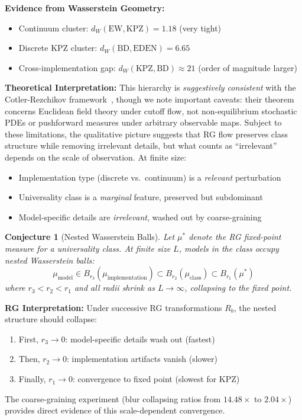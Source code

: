 \documentclass[aps,pre,reprint,amsmath,amssymb,superscriptaddress]{revtex4-2}
\newtheorem{conjecture}{Conjecture}
\newcommand{\EW}{\text{EW}}
\newcommand{\KPZ}{\text{KPZ}}
\begin{document}
\textbf{Evidence from Wasserstein Geometry:}
\begin{itemize}
\item Continuum cluster: $d_W(\EW, \KPZ) = 1.18$ (very tight)
\item Discrete KPZ cluster: $d_W(\text{BD}, \text{EDEN}) = 6.65$
\item Cross-implementation gap: $d_W(\KPZ, \text{BD}) \approx 21$ (order of magnitude larger)
\end{itemize}

\textbf{Theoretical Interpretation:} This hierarchy is \emph{suggestively consistent} with the Cotler-Rezchikov framework~\cite{CotlerRezchikov2023}, though we note important caveats: their theorem concerns Euclidean field theory under cutoff flow, not non-equilibrium stochastic PDEs or pushforward measures under arbitrary observable maps. Subject to these limitations, the qualitative picture suggests that RG flow preserves class structure while removing irrelevant details, but what counts as ``irrelevant'' depends on the scale of observation. At finite size:
\begin{itemize}
\item Implementation type (discrete vs.~continuum) is a \emph{relevant} perturbation
\item Universality class is a \emph{marginal} feature, preserved but subdominant
\item Model-specific details are \emph{irrelevant}, washed out by coarse-graining
\end{itemize}

\begin{conjecture}[Nested Wasserstein Balls]
\label{conj:nested-balls}
Let $\mu^*$ denote the RG fixed-point measure for a universality class. At finite size $L$, models in the class occupy nested Wasserstein balls:
\begin{equation}
\mu_{\text{model}} \in B_{r_3}(\mu_{\text{implementation}}) \subset B_{r_2}(\mu_{\text{class}}) \subset B_{r_1}(\mu^*)
\end{equation}
where $r_3 < r_2 < r_1$ and all radii shrink as $L \to \infty$, collapsing to the fixed point.
\end{conjecture}

\textbf{RG Interpretation:} Under successive RG transformations $R_b$, the nested structure should collapse:
\begin{enumerate}
\item First, $r_3 \to 0$: model-specific details wash out (fastest)
\item Then, $r_2 \to 0$: implementation artifacts vanish (slower)
\item Finally, $r_1 \to 0$: convergence to fixed point (slowest for KPZ)
\end{enumerate}
The coarse-graining experiment (blur collapsing ratios from $14.48\times$ to $2.04\times$) provides direct evidence of this scale-dependent convergence.
\end{document}
